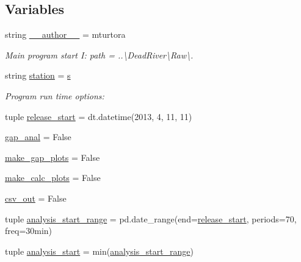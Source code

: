 \subsection*{Variables}
\begin{DoxyCompactItemize}
\item 
string \hyperlink{namespace_date___ranges___concat__mod_a95cae999ceb9637283600cf3186e2a68}{\+\_\+\+\_\+author\+\_\+\+\_\+} = \textquotesingle{}mturtora\textquotesingle{}
\begin{DoxyCompactList}\small\item\em Main program start I\+: path = \textquotesingle{}..\textbackslash{}Dead\+River\textbackslash{}Raw\textbackslash{}\textquotesingle{}. \end{DoxyCompactList}\item 
string \hyperlink{namespace_date___ranges___concat__mod_a042a8bd1d8e0f1a68b7ccb4c9d3b6f09}{station} = \textquotesingle{}\hyperlink{namespace_date___ranges___concat__mod_accfa90ffb586c78876af1d026419e456}{s}\textquotesingle{}
\begin{DoxyCompactList}\small\item\em Program run time options\+: \end{DoxyCompactList}\item 
tuple \hyperlink{namespace_date___ranges___concat__mod_a9f3f490646543752529e8feb85f4910d}{release\+\_\+start} = dt.\+datetime(2013, 4, 11, 11)
\item 
\hyperlink{namespace_date___ranges___concat__mod_a73ab5cf3024b5ab0814e9e5b5b681490}{gap\+\_\+anal} = False
\item 
\hyperlink{namespace_date___ranges___concat__mod_a57a0f5655be4ce75050567a5862c8dfb}{make\+\_\+gap\+\_\+plots} = False
\item 
\hyperlink{namespace_date___ranges___concat__mod_ade5d373c30911b73d8e99d06c3da1645}{make\+\_\+calc\+\_\+plots} = False
\item 
\hyperlink{namespace_date___ranges___concat__mod_a80e0c8152ed14726f95ea18921062ace}{csv\+\_\+out} = False
\item 
tuple \hyperlink{namespace_date___ranges___concat__mod_a793a36c383b1e5c6447a6ac222c5bd17}{analysis\+\_\+start\+\_\+range} = pd.\+date\+\_\+range(end=\hyperlink{namespace_date___ranges___concat__mod_a9f3f490646543752529e8feb85f4910d}{release\+\_\+start}, periods=70, freq=\textquotesingle{}30min\textquotesingle{})
\item 
tuple \hyperlink{namespace_date___ranges___concat__mod_a9a8ee3741706967bbeca1b4c38f25563}{analysis\+\_\+start} = min(\hyperlink{namespace_date___ranges___concat__mod_a793a36c383b1e5c6447a6ac222c5bd17}{analysis\+\_\+start\+\_\+range})

\end{DoxyCompactItemize}
